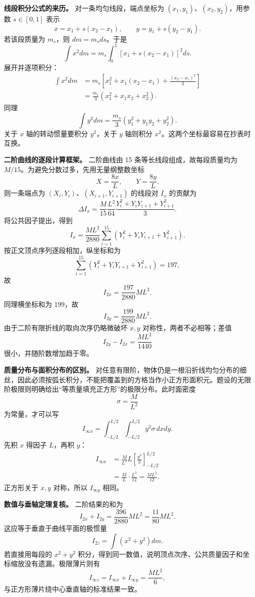 \documentclass[12pt,a4paper,UTF8]{ctexart}
\begin{document}
\textbf{线段积分公式的来历。} 对一条均匀线段，端点坐标为
\((x_1,y_1)\)、\((x_2,y_2)\)，用参数 \(s\in[0,1]\) 表示 \[
x=x_1+s(x_2-x_1),\qquad
y=y_1+s(y_2-y_1).
\] 若该段质量为 \(m_s\)，则 \(dm=m_sds\)。于是 \[
\int x^2dm
=m_s\int_0^1[x_1+s(x_2-x_1)]^2ds.
\] 展开并逐项积分： \[
\begin{aligned}
\int x^2dm
&=m_s\left[x_1^2+x_1(x_2-x_1)+\frac{(x_2-x_1)^2}{3}\right]\\
&=\frac{m_s}{3}(x_1^2+x_1x_2+x_2^2).
\end{aligned}
\] 同理 \[
\int y^2dm=\frac{m_s}{3}(y_1^2+y_1y_2+y_2^2).
\] 关于 \(x\) 轴的转动惯量要积分 \(y^2\)，关于 \(y\) 轴则积分
\(x^2\)。这两个坐标最容易在抄表时互换。

\textbf{二阶曲线的逐段计算框架。} 二阶曲线由 15
条等长线段组成，故每段质量均为
\(M/15\)。为避免分数过多，先用无量纲整数坐标 \[
X=\frac{8x}{L},\qquad Y=\frac{8y}{L}.
\] 则一条端点为 \((X_i,Y_i)\)、\((X_{i+1},Y_{i+1})\) 的线段对 \(I_x\)
的贡献为 \[
\Delta I_x
=\frac{M}{15}\frac{L^2}{64}
\frac{Y_i^2+Y_iY_{i+1}+Y_{i+1}^2}{3}.
\] 将公共因子提出，得到 \[
I_x=\frac{ML^2}{2880}
\sum_{i=1}^{15}
(Y_i^2+Y_iY_{i+1}+Y_{i+1}^2).
\] 按正文顶点序列逐段相加，纵坐标和为 \[
\sum_{i=1}^{15}(Y_i^2+Y_iY_{i+1}+Y_{i+1}^2)=197,
\] 故 \[
I_{2x}=\frac{197}{2880}ML^2.
\] 同理横坐标和为 199，故 \[
I_{2y}=\frac{199}{2880}ML^2.
\] 由于二阶有限折线的取向次序仍略微破坏 \(x,y\)
对称性，两者不必相等；差值 \[
I_{2y}-I_{2x}=\frac{ML^2}{1440}
\] 很小，并随阶数增加趋于零。

\textbf{质量分布与面积分布的区别。}
对任意有限阶，物体仍是一根沿折线均匀分布的细丝，因此必须按弧长积分，不能把覆盖到的方格当作小正方形面积元。题设的无限阶极限则明确给出``等质量填充正方形''的极限分布。此时面密度
\[
\sigma=\frac{M}{L^2}
\] 为常量，才可以写 \[
I_{\infty x}
=\int_{-L/2}^{L/2}\int_{-L/2}^{L/2}y^2\sigma\,dxdy.
\] 先积 \(x\) 得因子 \(L\)，再积 \(y\)： \[
\begin{aligned}
I_{\infty x}
&=\frac{M}{L^2}L
\left[\frac{y^3}{3}\right]_{-L/2}^{L/2}\\
&=\frac{M}{L}\cdot\frac{L^3}{12}
=\frac{ML^2}{12}.
\end{aligned}
\] 正方形关于 \(x,y\) 对称，所以 \(I_{\infty y}\) 相同。

\textbf{数值与垂轴定理复核。} 二阶结果的和为 \[
I_{2x}+I_{2y}
=\frac{396}{2880}ML^2
=\frac{11}{80}ML^2.
\] 这应等于垂直于曲线平面的极惯量 \[
I_{2z}=\int(x^2+y^2)dm.
\] 若直接用每段的 \(x^2+y^2\)
积分，得到同一数值，说明顶点次序、公共质量因子和坐标缩放没有遗漏。极限薄片则有
\[
I_{\infty z}=I_{\infty x}+I_{\infty y}=\frac{ML^2}{6},
\] 与正方形薄片绕中心垂直轴的标准结果一致。
\end{document}
